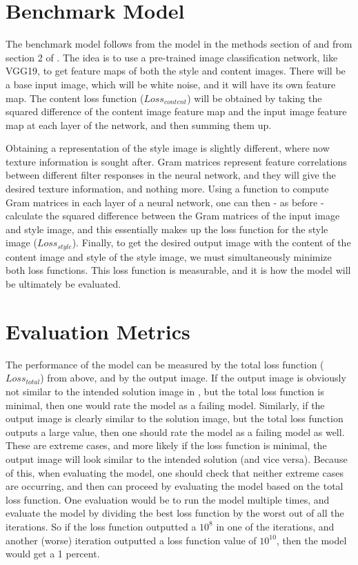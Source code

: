 \documentclass[9pt]{article}
\begin{document}
\section{Benchmark Model}
The benchmark model follows from the model in the methods section of \cite{Neural} and from section 2 of \cite{Image}. The idea is to use a pre-trained image classification network, like VGG19, to get feature maps of both the style and content images. There will be a base input image, which will be white noise, and it will have its own feature map. The content loss function ($Loss_{content}$) will be obtained by taking the squared difference of the content image feature map and the input image feature map at each layer of the network, and then summing them up. 

Obtaining a representation of the style image is slightly different, where now texture information is sought after. Gram matrices represent feature correlations between different filter responses in the neural network, and they will give the desired texture information, and nothing more. Using a function to compute Gram matrices in each layer of a neural network, one can then - as before - calculate the squared difference between the Gram matrices of the input image and style image, and this essentially makes up the loss function for the style image ($Loss_{style}$). Finally, to get the desired output image with the content of the content image and style of the style image, we must simultaneously minimize both loss functions. This loss function is measurable, and it is how the model will be ultimately be evaluated.

\section{Evaluation Metrics}
The performance of the model can be measured by the total loss function ($Loss_{total}$) from above, and by the output image. If the output image is obviously not similar to the intended solution image in \cite{Neural, Image}, but the total loss function is minimal, then one would rate the model as a failing model. Similarly, if the output image is clearly similar to the solution image, but the total loss function outputs a large value, then one should rate the model as a failing model as well. These are extreme cases, and more likely if the loss function is minimal, the output image will look similar to the intended solution (and vice versa). Because of this, when evaluating the model, one should check that neither extreme cases are occurring, and then can proceed by evaluating the model based on the total loss function. One evaluation would be to run the model multiple times, and evaluate the model by dividing the best loss function by the worst out of all the iterations. So if the loss function outputted a $10^8$ in one of the iterations, and another (worse) iteration outputted a loss function value of $10^{10}$, then the model would get a 1 percent.
\end{document}
